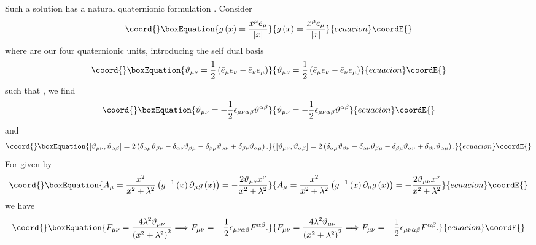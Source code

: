 \documentclass[a4paper,12pt]{book}
\begin{document}
Such a solution has a natural quaternionic formulation \cite{nash}\cite{adhm}%
. Consider 
\begin{equation}\coord{}\boxEquation{
g\left( x\right) =\frac{x^{\mu }e_{\mu }}{\left| x\right| }
}{
g\left( x\right) =\frac{x^{\mu }e_{\mu }}{\left| x\right| }
}{ecuacion}\coordE{}\end{equation}
where \coordHE{} are our four quaternionic units, introducing the self dual \coordHE{} basis 
\begin{equation}\coord{}\boxEquation{
\vartheta _{\mu \nu }=\frac{1}{2}\left( \bar{e}_{\mu }e_{\nu }-\bar{e}_{\nu
}e_{\mu }\right)
}{
\vartheta _{\mu \nu }=\frac{1}{2}\left( \bar{e}_{\mu }e_{\nu }-\bar{e}_{\nu
}e_{\mu }\right)
}{ecuacion}\coordE{}\end{equation}
such that \coordHE{}, we find 
\begin{equation}\coord{}\boxEquation{
\vartheta _{\mu \nu }=-\frac{1}{2}\epsilon _{\mu \nu \alpha \beta }\vartheta
^{\alpha \beta }
}{
\vartheta _{\mu \nu }=-\frac{1}{2}\epsilon _{\mu \nu \alpha \beta }\vartheta
^{\alpha \beta }
}{ecuacion}\coordE{}\end{equation}
and 
\begin{equation}\coord{}\boxEquation{
\left[ \vartheta _{\mu \nu },\vartheta _{\alpha \beta }\right] =2\left(
\delta _{\alpha \mu }\vartheta _{\beta \nu }-\delta _{\alpha \nu }\vartheta
_{\beta \mu }-\delta _{\beta \mu }\vartheta _{\alpha \nu }+\delta _{\beta
\nu }\vartheta _{\alpha \mu }\right) .
}{
\left[ \vartheta _{\mu \nu },\vartheta _{\alpha \beta }\right] =2\left(
\delta _{\alpha \mu }\vartheta _{\beta \nu }-\delta _{\alpha \nu }\vartheta
_{\beta \mu }-\delta _{\beta \mu }\vartheta _{\alpha \nu }+\delta _{\beta
\nu }\vartheta _{\alpha \mu }\right) .
}{ecuacion}\coordE{}\end{equation}
For \coordHE{} given by 
\begin{equation}\coord{}\boxEquation{
A_{\mu }=\frac{x^{2}}{x^{2}+\lambda ^{2}}\left( g^{-1}\left( x\right)
\partial _{\mu }g\left( x\right) \right) =-\frac{2\Bbb{\vartheta }_{\mu \nu
}x^{\nu }}{x^{2}+\lambda ^{2}}
}{
A_{\mu }=\frac{x^{2}}{x^{2}+\lambda ^{2}}\left( g^{-1}\left( x\right)
\partial _{\mu }g\left( x\right) \right) =-\frac{2\Bbb{\vartheta }_{\mu \nu
}x^{\nu }}{x^{2}+\lambda ^{2}}
}{ecuacion}\coordE{}\end{equation}
we have 
\begin{equation}\coord{}\boxEquation{
F_{\mu \nu }=\frac{4\lambda ^{2}\Bbb{\vartheta }_{\mu \nu }}{\left(
x^{2}+\lambda ^{2}\right) ^{2}}\Longrightarrow F_{\mu \nu }=-\frac{1}{2}
\epsilon _{\mu \nu \alpha \beta }F^{\alpha \beta }.
}{
F_{\mu \nu }=\frac{4\lambda ^{2}\Bbb{\vartheta }_{\mu \nu }}{\left(
x^{2}+\lambda ^{2}\right) ^{2}}\Longrightarrow F_{\mu \nu }=-\frac{1}{2}
\epsilon _{\mu \nu \alpha \beta }F^{\alpha \beta }.
}{ecuacion}\coordE{}\end{equation}
\end{document}
